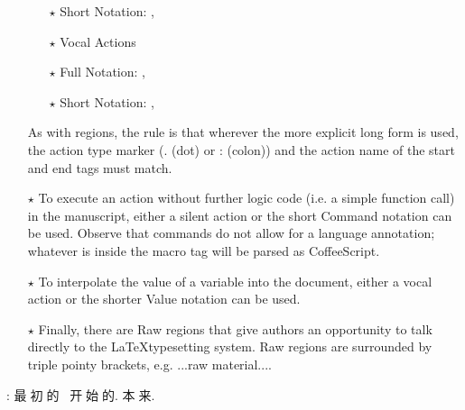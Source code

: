 \begin{itemize}
\begin{itemize}
\item[$\star$] Short Notation: {}, {}\mktsShowpar\par

\item[$\star$] {\mktsStyleBold{}Vocal Actions}\mktsShowpar\par

\item[$\star$] Full Notation: {}, {}\mktsShowpar\par

\item[$\star$] Short Notation: {}, {}\mktsShowpar\par

\end{itemize}As with regions, the rule is that wherever the more explicit long form
is used, the action type marker ({\mktsStyleCode{}.} (dot) or {\mktsStyleCode{}:} (colon)) and the action
name of the start and end tags must match.\mktsShowpar\par

\item[$\star$] To execute an action without further logic code (i.e. a simple function call)  
in the manuscript, either a silent action {} or the
short {\mktsStyleBold{}Command} notation {} can be used. Observe that
commands do not allow for a language annotation; whatever is inside
the macro tag will be parsed as CoffeeScript.\mktsShowpar\par

\item[$\star$] To interpolate the value of a variable into the document,
either a vocal action {} or the shorter {\mktsStyleBold{}Value}
notation {} can be used.
\mktsShowpar\par

\item[$\star$] Finally, there are {\mktsStyleBold{}Raw} regions that give authors an opportunity
to talk directly to the \LaTeX typesetting system. Raw regions are
surrounded by triple pointy brackets, e.g. {\mktsStyleCode{}...raw material...}.\mktsShowpar\par

\end{itemize}{}: {\cn{}最初的，开始的}. {\cn{}本来}.
